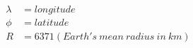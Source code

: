 \begin{align}
 \label{eqn:1}
  \lambda &= longitude\\[6pt]
 \label{eqn:2}
  \phi &= latitude\\[6pt]
 \label{eqn:3}
  R &= 6371 (Earth's\:mean\:radius\:in\:km)
\end{align}
